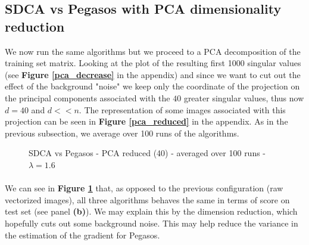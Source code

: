 \documentclass[10pt,a4paper]{article}
\begin{document}
\FloatBarrier
\subsection {SDCA vs Pegasos with PCA dimensionality reduction}

We now run the same algorithms but we proceed to a PCA decomposition of the training set matrix. Looking at the plot of the resulting first 1000 singular values (see \textbf{Figure \ref{pca_decrease}} in the appendix) and since we want to cut out the effect of the background "noise" we keep only the coordinate of the projection on the principal components associated with the $40$ greater singular values, thus now $d=40$ and $d << n$. The representation of some images associated with this projection can be seen in \textbf{Figure \ref{pca_reduced}} in the appendix. As in the previous subsection, we average over 100 runs of the algorithms.




\begin{figure}[!tbp]
  \centering
  \hfill
  \hfill
  \caption{SDCA vs Pegasos - PCA reduced (40) - averaged over 100 runs - $\lambda = 1.6$}\label{comparison_pca}
\end{figure}


\paragraph{}
We can see in \textbf{Figure \ref{comparison_pca}} that, as opposed to the previous configuration (raw vectorized images), all three algorithms behaves the same in terms of score on test set (see panel \textbf{(b)}). We may explain this by the dimension reduction, which hopefully cuts out some background noise. This may help reduce the variance in the estimation of the gradient for Pegasos.
\end{document}
